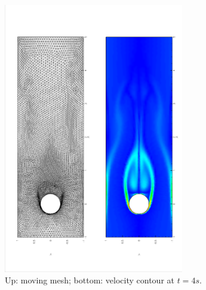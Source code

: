 \documentclass[a4paper, 11pt]{article}
\begin{document}
     \begin{figure}[!htbp]
        \centering
        \includegraphics[width = 0.7\textwidth, angle = -90]{picture/obstacle_flow_data/mesh_t_4s.eps}
        \caption{\small Up: moving mesh; bottom: velocity contour at
          $t = 4s$.}
        \label{fig::cylinder_mesh_t4s}
      \end{figure}

\end{document}
